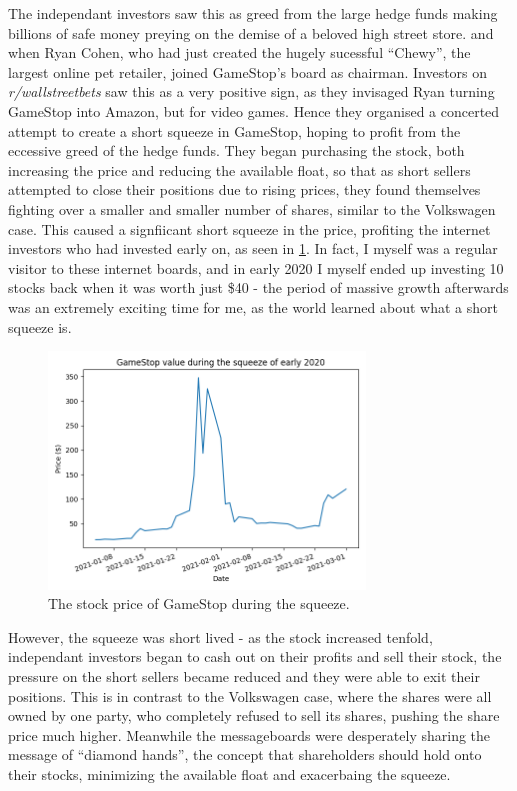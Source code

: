 \documentclass[11pt]{article} %
\begin{document}
The independant investors saw this as greed from the large hedge funds making billions 
of safe money preying on the demise of a beloved high street store. and when Ryan Cohen, 
who had just created the hugely sucessful 
``Chewy'', the largest online pet retailer, joined GameStop's board as chairman. Investors
on \textit{r/wallstreetbets} saw this as a very positive sign, 
as they invisaged Ryan turning GameStop into Amazon, but for video games. Hence they 
organised a concerted attempt to create a 
short squeeze in GameStop, hoping to profit from the eccessive greed of the hedge funds. They 
began purchasing the stock, both increasing the price and reducing the available float, 
so that as short sellers attempted to close their positions due to rising prices, they 
found themselves fighting over a smaller and smaller number of shares, similar to the 
Volkswagen case. This caused a signfiicant short squeeze in the price, profiting the 
internet investors who had invested early on, as seen in \ref{shortsqeeze}. In fact, I myself 
was a regular visitor to these internet boards, and in early 2020 I myself ended up investing 
10 stocks back when it was worth just \$40 - the period of massive growth afterwards was an 
extremely exciting time for me, as the world learned about what a short squeeze is.
\begin{figure}[h]
    \centering
    \includegraphics[width=0.75\textwidth]{gameStopSqueezeValue.png}
    \caption{The stock price of GameStop during the squeeze.}
    \label{shortsqeeze}
    \end{figure}
However, the squeeze was short lived - as the stock increased tenfold, independant 
investors began to cash out on their profits and sell their stock, the pressure 
on the short sellers became reduced and they were able to exit their positions. 
This is in contrast to the Volkswagen case, where the shares were all owned by one 
party, who completely refused to sell its shares, pushing the share price much higher. 
Meanwhile the messageboards were desperately sharing the message of ``diamond hands'', 
the concept that shareholders should hold onto their stocks, minimizing the available 
float and exacerbaing the squeeze.
\end{document}
